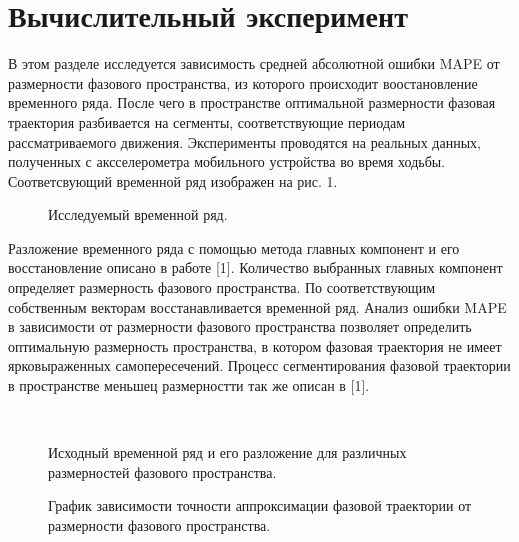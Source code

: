 \documentclass[12pt, twoside]{article}
\begin{document}
\section{Вычислительный эксперимент}
В этом разделе исследуется зависимость средней абсолютной ошибки MAPE от размерности фазового пространства, из которого происходит воостановление временного ряда. После чего в пространстве оптимальной размерности фазовая траектория разбивается на сегменты, соответствующие периодам рассматриваемого движения. Эксперименты проводятся на реальных данных, полученных с аксселерометра мобильного устройства во время ходьбы. Соответсвующий временной ряд изображен на рис. 1.

    \begin{figure}[h!]
	    \caption{Исследуемый временной ряд.}
    \end{figure}
    
Разложение временного ряда с помощью метода главных компонент и его восстановление описано в работе [1]. Количество выбранных главных компонент определяет размерность фазового пространства. По соответствующим собственным векторам восстанавливается временной ряд. Анализ ошибки MAPE в зависимости от размерности фазового пространства позволяет определить оптимальную размерность пространства, в котором фазовая траектория не имеет ярковыраженных самопересечений. Процесс сегментирования фазовой траектории в пространстве меньшец размерностти так же описан в [1].
    
    \begin{figure}[ht]
        \\
        \caption{Исходный временной ряд и его разложение для различных размерностей фазового пространства.}
        \label{fg:mod}
    \end{figure}

    
    \begin{figure}[ht]
	    \caption{График зависимости точности аппроксимации фазовой траектории от размерности фазового пространства.}
    \end{figure}
    
\newpage


\end{document}
